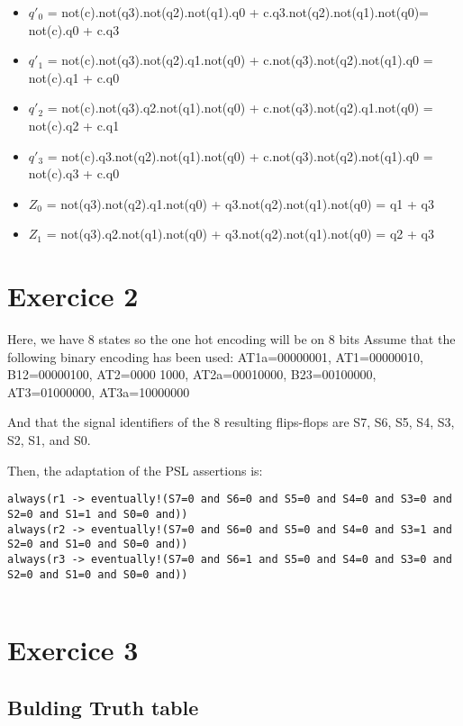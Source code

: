 \documentclass{article}
\newcommand{\alinea}{
\textbf{\hspace{8mm}}
}
\newcommand{\sautligne}{
\textbf{\vspace{5mm}}
}
\begin{document}
\begin{itemize}
\item $q'_0$ = not(c).not(q3).not(q2).not(q1).q0 +  c.q3.not(q2).not(q1).not(q0)= not(c).q0 + c.q3
\item $q'_1$ = not(c).not(q3).not(q2).q1.not(q0) +  c.not(q3).not(q2).not(q1).q0 = not(c).q1 + c.q0
\item $q'_2$ = not(c).not(q3).q2.not(q1).not(q0) + c.not(q3).not(q2).q1.not(q0) = not(c).q2 + c.q1
\item $q'_3$ = not(c).q3.not(q2).not(q1).not(q0) + c.not(q3).not(q2).not(q1).q0 = not(c).q3 + c.q0
\item $Z_0$ = not(q3).not(q2).q1.not(q0) + q3.not(q2).not(q1).not(q0) = q1 + q3
\item $Z_1$ = not(q3).q2.not(q1).not(q0) + q3.not(q2).not(q1).not(q0) = q2 + q3
\end{itemize} 


\section{Exercice 2}
Here, we have 8 states so the one hot encoding will be on 8 bits
Assume that the following binary encoding has been used: AT1a=00000001, AT1=00000010, B12=00000100, AT2=0000 1000,
AT2a=00010000, B23=00100000, AT3=01000000, AT3a=10000000

\alinea  And that the signal identifiers of the 8 resulting flips-flops are
S7, S6, S5, S4, S3, S2, S1, and S0. 
\sautligne

Then, the adaptation of the PSL assertions is:
\begin{verbatim}
always(r1 -> eventually!(S7=0 and S6=0 and S5=0 and S4=0 and S3=0 and S2=0 and S1=1 and S0=0 and))
always(r2 -> eventually!(S7=0 and S6=0 and S5=0 and S4=0 and S3=1 and S2=0 and S1=0 and S0=0 and))
always(r3 -> eventually!(S7=0 and S6=1 and S5=0 and S4=0 and S3=0 and S2=0 and S1=0 and S0=0 and))


\end{verbatim}


\section{Exercice 3}


\subsection{Bulding Truth table}
\end{document}

